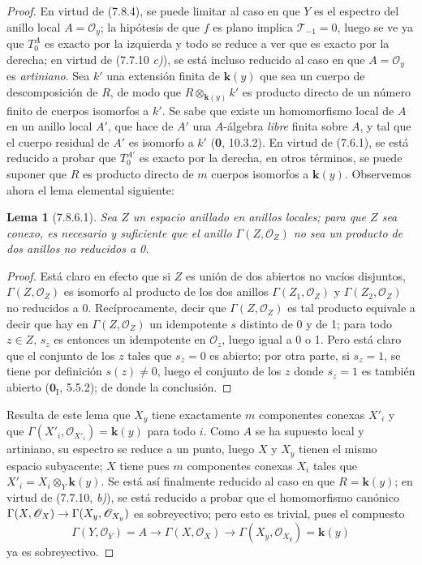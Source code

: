 \documentclass[10pt,oneside,openany]{book}
\theoremstyle{egaenv}\newtheorem*{env}{---}
\theoremstyle{egastatement}
\newtheorem*{lemma}{Lema}
\theoremstyle{egadescription}
\newcommand{\oldpage}[2][]{\marginnote{\normalfont\scriptsize\textbf{#1}\,|\,#2}\ignorespaces}
\renewcommand{\to}{\mathchoice{\longrightarrow}{\rightarrow}{\rightarrow}{\rightarrow}}
\begin{document}
\begin{proof}
En virtud de (7.8.4), se puede limitar al caso en que $Y$ es el espectro del anillo
local $A=\mathscr O_y$; la hipótesis de que $f$ es plano implica
$\mathscr T_{-1}=0$, luego se ve ya que $T_0^A$ es exacto por la izquierda y todo
se reduce a ver que es exacto por la derecha; en virtud de (7.7.10 \emph{c)}), se está incluso
reducido al caso en que $A=\mathscr O_y$ es \emph{artiniano}. Sea $k'$ una extensión
finita de $\boldsymbol{k}(y)$ que sea un cuerpo de descomposición de $R$, de modo que
$R\otimes_{\mathbf{k}(y)}k'$ es producto directo de un número finito de cuerpos
isomorfos a $k'$. Se sabe que existe un homomorfismo local de $A$ en un
anillo local $A'$, que hace de $A'$ una $A$-álgebra \emph{libre} finita sobre $A$,
y tal que el cuerpo residual de $A'$ es isomorfo a $k'$ (\textbf{0},
10.3.2). En virtud de (7.6.1), se está reducido a probar que $T_0^{A'}$ es exacto
por la derecha, en otros términos, se puede suponer que $R$ es producto directo de $m$
cuerpos isomorfos a $\boldsymbol{k}(y)$. Observemos ahora el lema elemental
siguiente:

\begin{lemma}[7.8.6.1]
Sea $Z$ un espacio anillado en anillos locales; para que $Z$ sea conexo,
\oldpage[III]{207}
es necesario y suficiente que el anillo $\Gamma(Z,\mathscr O_Z)$ no sea un producto
de dos anillos no reducidos a 0.
\end{lemma}

\begin{proof}
Está claro en efecto que si $Z$ es unión de dos abiertos no vacíos disjuntos,
$\Gamma(Z,\mathscr O_Z)$ es isomorfo al producto de los dos anillos
$\Gamma(Z_1,\mathscr O_Z)$ y $\Gamma(Z_2,\mathscr O_Z)$ no reducidos a 0.
Recíprocamente, decir que $\Gamma(Z,\mathscr O_Z)$ es tal producto equivale a
decir que hay en $\Gamma(Z,\mathscr O_Z)$ un idempotente $s$ distinto de 0 y
de 1; para todo $z\in Z$, $s_z$ es entonces un idempotente en $\mathscr O_z$,
luego igual a 0 o 1. Pero está claro que el conjunto de los $z$ tales que $s_z=0$
es abierto; por otra parte, si $s_z=1$, se tiene por definición $s(z)\ne0$, luego
el conjunto de los $z$ donde $s_z=1$ es también abierto ($\mathbf{0}_{\mathrm I}$, 5.5.2); de donde
la conclusión.
\end{proof}

Resulta de este lema que $X_y$ tiene exactamente $m$ componentes conexas $X'_i$
y que $\Gamma(X'_i,\mathscr O_{X'_i})=\boldsymbol{k}(y)$ para todo $i$. Como $A$ se ha
supuesto local y artiniano, su espectro se reduce a un punto, luego $X$ y $X_y$
tienen el mismo espacio subyacente; $X$ tiene pues $m$ componentes conexas $X_i$ tales
que $X'_i=X_i\otimes_Y\boldsymbol{k}(y)$. Se está así finalmente reducido al caso en que
$R=\boldsymbol{k}(y)$; en virtud de (7.7.10, \emph{b)}), se está reducido a probar que
el homomorfismo canónico
$\Gamma(X,\mathscr O_X)\to\Gamma(X_y,\mathscr O_{X_y})$
es sobreyectivo; pero esto es trivial, pues el compuesto
\[
  \Gamma(Y,\mathscr O_Y)=A
  \longrightarrow
  \Gamma(X,\mathscr O_X)
  \longrightarrow
  \Gamma(X_y,\mathscr O_{X_y})=\boldsymbol{k}(y)
\]
ya es sobreyectivo.
\end{proof}
\end{document}
